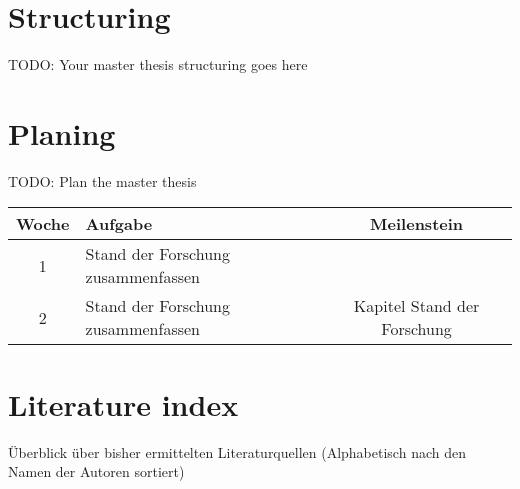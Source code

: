 \section{Structuring}
\label{sec:Structuring}
TODO: Your master thesis structuring goes here

\section{Planing}
\label{sec:planing}
TODO: Plan the master thesis

\begin{table}[!h]
\begin{tabularx}{\textwidth}{ |c|X|c| }
  \hline
  Woche & Aufgabe & Meilenstein  \\
  \hline 
  1  & Stand der Forschung zusammenfassen&  \\ \hline
  2  & Stand der Forschung zusammenfassen & Kapitel Stand der Forschung   \\
  \hline
\end{tabularx}
\end{table}

\section{Literature index}
\label{sec:literature-index}
Überblick über bisher ermittelten Literaturquellen (Alphabetisch nach den Namen der Autoren sortiert)
\nocite{*}
\singlespacing %

